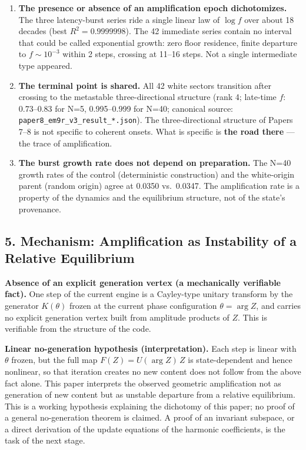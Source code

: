 \documentclass[
  a4paper,
]{article}
\providecommand{\tightlist}{%
  \setlength{\itemsep}{0pt}\setlength{\parskip}{0pt}}
\begin{document}
\begin{enumerate}
\def\labelenumi{\arabic{enumi}.}
\tightlist
\item
  \textbf{The presence or absence of an amplification epoch
  dichotomizes.} The three latency-burst series ride a single linear law
  of \(\log f\) over about 18 decades (best \(R^2=0.9999998\)). The 42
  immediate series contain no interval that could be called exponential
  growth: zero floor residence, finite departure to \(f\sim10^{-3}\)
  within 2 steps, crossing at 11--16 steps. Not a single intermediate
  type appeared.
\item
  \textbf{The terminal point is shared.} All 42 white sectors transition
  after crossing to the metastable three-directional structure (rank 4;
  late-time \(f\): 0.73--0.83 for N=5, 0.995--0.999 for N=40; canonical
  source: \texttt{paper8\_em9r\_v3\_result\_*.json}). The
  three-directional structure of Papers 7--8 is not specific to coherent
  onsets. What is specific is \textbf{the road there} --- the trace of
  amplification.
\item
  \textbf{The burst growth rate does not depend on preparation.} The
  N=40 growth rates of the control (deterministic construction) and the
  white-origin parent (random origin) agree at 0.0350 vs.~0.0347. The
  amplification rate is a property of the dynamics and the equilibrium
  structure, not of the state's provenance.
\end{enumerate}

\subsection{5. Mechanism: Amplification as Instability of a Relative
Equilibrium}\label{mechanism-amplification-as-instability-of-a-relative-equilibrium}

\textbf{Absence of an explicit generation vertex (a mechanically
verifiable fact).} One step of the current engine is a Cayley-type
unitary transform by the generator \(K(\theta)\) frozen at the current
phase configuration \(\theta=\arg Z\), and carries no explicit
generation vertex built from amplitude products of \(Z\). This is
verifiable from the structure of the code.

\textbf{Linear no-generation hypothesis (interpretation).} Each step is
linear with \(\theta\) frozen, but the full map \(F(Z)=U(\arg Z)\,Z\) is
state-dependent and hence nonlinear, so that iteration creates no new
content does not follow from the above fact alone. This paper interprets
the observed geometric amplification not as generation of new content
but as unstable departure from a relative equilibrium. This is a working
hypothesis explaining the dichotomy of this paper; no proof of a general
no-generation theorem is claimed. A proof of an invariant subspace, or a
direct derivation of the update equations of the harmonic coefficients,
is the task of the next stage.
\end{document}
